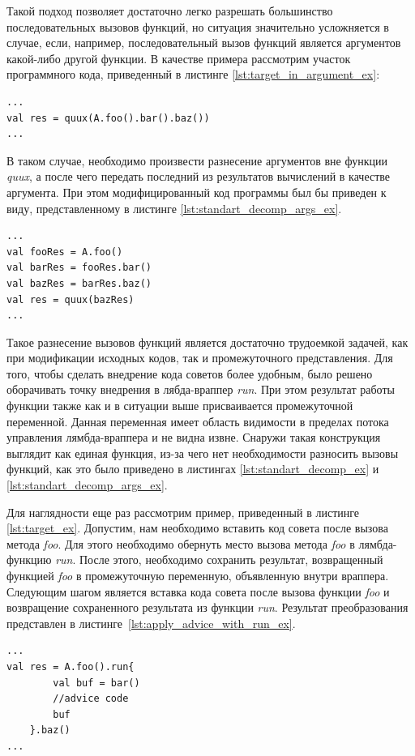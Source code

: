 Такой подход позволяет достаточно легко разрешать большинство последовательных
вызовов функций, но ситуация значительно усложняется в случае, если, например,
последовательный вызов функций является аргументов какой-либо другой функции.
В качестве примера рассмотрим участок программного кода, приведенный в листинге
\ref{lst:target_in_argument_ex}:
\begin{lstlisting}[label=lst:target_in_argument_ex,
    caption={Пример целевой точки внедрения, передаваемой в качестве аргумента другому методу}]
...
val res = quux(A.foo().bar().baz())
...
\end{lstlisting}
В таком случае, необходимо произвести разнесение аргументов вне функции
\textit{quux}, а после чего передать последний из результатов вычислений в
качестве аргумента.
При этом модифицированный код программы был бы приведен к виду, представленному
в листинге \ref{lst:standart_decomp_args_ex}.
\begin{lstlisting}[label=lst:standart_decomp_args_ex,
    caption={Пример разнесения вызовов методов, переданных в качестве аргументов}]
...
val fooRes = A.foo()
val barRes = fooRes.bar()
val bazRes = barRes.baz()
val res = quux(bazRes)
...
\end{lstlisting}

Такое разнесение вызовов функций является достаточно трудоемкой задачей, как
при модификации исходных кодов, так и промежуточного представления.
Для того, чтобы сделать внедрение кода советов более удобным, было решено
оборачивать точку внедрения в лябда-враппер \textit{run}.
При этом результат работы функции также как и в ситуации выше присваивается
промежуточной переменной.
Данная переменная имеет область видимости в пределах потока управления
лямбда-враппера и не видна извне.
Снаружи такая конструкция выглядит как единая функция, из-за чего нет
необходимости разносить вызовы функций, как это было приведено в листингах
\ref{lst:standart_decomp_ex} и \ref{lst:standart_decomp_args_ex}.

Для наглядности еще раз рассмотрим пример, приведенный в листинге
\ref{lst:target_ex}.
Допустим, нам необходимо вставить код совета после вызова метода \textit{foo}.
Для этого необходимо обернуть место вызова метода \textit{foo} в лямбда-функцию
\textit{run}.
После этого, необходимо сохранить результат, возвращенный функцией \textit{foo}
в промежуточную переменную, объявленную внутри враппера.
Следующим шагом является вставка кода совета после вызова функции \textit{foo} и возвращение сохраненного результата из функции \textit{run}.
Результат преобразования представлен в листинге~\ref{lst:apply_advice_with_run_ex}.
\begin{lstlisting}[label=lst:apply_advice_with_run_ex,
    caption={Пример внедрения кода совета с использованием функции run}]
...
val res = A.foo().run{
        val buf = bar()
        //advice code
        buf
    }.baz()
...
\end{lstlisting}

